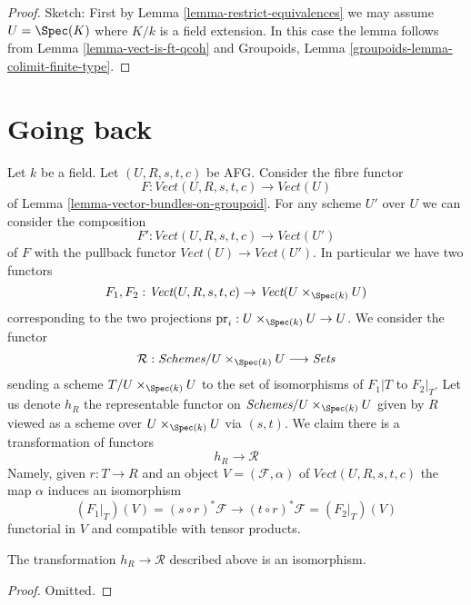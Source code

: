\begin{proof}
Sketch: First by Lemma \ref{lemma-restrict-equivalences}
we may assume $U = \Spec(K)$ where $K/k$ is a field extension.
In this case the lemma follows from Lemma \ref{lemma-vect-is-ft-qcoh}
and Groupoids, Lemma \ref{groupoids-lemma-colimit-finite-type}.
\end{proof}





\section{Going back}
\label{section-going-back}

\noindent
Let $k$ be a field. Let $(U, R, s, t, c)$ be AFG. Consider the fibre functor
$$
F : \textit{Vect}(U, R, s, t, c) \to \textit{Vect}(U)
$$
of Lemma \ref{lemma-vector-bundles-on-groupoid}. For any scheme
$U'$ over $U$ we can consider the composition
$$
F' : \textit{Vect}(U, R, s, t, c) \to \textit{Vect}(U')
$$
of $F$ with the pullback functor $\textit{Vect}(U) \to \textit{Vect}(U')$.
In particular we have two functors
$$
F_1, F_2 :
\textit{Vect}(U, R, s, t, c)
\to
\textit{Vect}(U \times_{\Spec(k)} U)
$$
corresponding to the two projections
$\text{pr}_i : U \times_{\Spec(k)} U \to U$. We consider the functor
$$
\mathcal{R} :
\textit{Schemes}/U \times_{\Spec(k)} U \longrightarrow \textit{Sets}
$$
sending a scheme $T/U \times_{\Spec(k)} U$ to the set of isomorphisms
of $F_1|T$ to $F_2|_T$. Let us denote $h_R$ the representable functor
on $\textit{Schemes}/U \times_{\Spec(k)} U$ given by $R$ viewed as
a scheme over $U \times_{\Spec(k)} U$ via $(s, t)$.
We claim there is a transformation of functors
$$
h_R \longrightarrow \mathcal{R}
$$
Namely, given $r : T \to R$ and an object $V = (\mathcal{F}, \alpha)$ of
$\textit{Vect}(U, R, s, t, c)$ the map $\alpha$ induces an isomorphism
$$
(F_1|_T)(V) = (s \circ r)^*\mathcal{F}
\longrightarrow
(t \circ r)^*\mathcal{F} = (F_2|_T)(V)
$$
functorial in $V$ and compatible with tensor products.

\begin{lemma}
\label{lemma-equivalence}
The transformation $h_R \longrightarrow \mathcal{R}$
described above is an isomorphism.
\end{lemma}

\begin{proof}
Omitted.
\end{proof}














